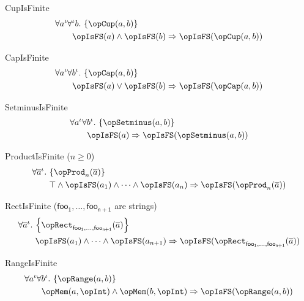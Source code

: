\documentclass[11pt, a4paper, oneside]{article}
\begin{document}
\begin{axioms}
\item[CupIsFinite] \[
        \begin{aligned}
            &\forall a^\idv \forall^\idv b.\, \st{ \opCup(a, b) } \\
            &\qquad \opIsFS(a) \wedge \opIsFS(b) \imp \opIsFS(\opCup(a, b))
        \end{aligned}
    \]

\item[CapIsFinite] \[
        \begin{aligned}
            &\forall a^\idv \forall b^\idv.\, \st{ \opCap(a, b) } \\
            &\qquad \opIsFS(a) \vee \opIsFS(b) \imp \opIsFS(\opCap(a, b))
        \end{aligned}
    \]

\item[SetminusIsFinite] \[
        \begin{aligned}
            &\forall a^\idv \forall b^\idv.\, \st{ \opSetminus(a, b) } \\
            &\qquad \opIsFS(a) \imp \opIsFS(\opSetminus(a, b))
        \end{aligned}
    \]

\item[ProductIsFinite ($n \ge 0$)] \[
        \begin{aligned}
            &\forall \overline{a}^\idv.\, \st{ \opProd_n(\overline{a}) } \\
            &\qquad \top \wedge \opIsFS(a_1) \wedge \dots \wedge \opIsFS(a_n) \imp \opIsFS(\opProd_n(\overline{a}))
        \end{aligned}
    \]

\item[RectIsFinite (\rm$\mathsf{foo_1},\dots,\mathsf{foo_{n+1}}$ are strings)] \[
        \begin{aligned}
            &\forall \overline{a}^\idv.\, \st{ \opRect_{\mathsf{foo_1}, \dots, \mathsf{foo_{n+1}}}(\overline{a}) } \\
            &\qquad \opIsFS(a_1) \wedge \dots \wedge \opIsFS(a_{n+1}) \imp \opIsFS(\opRect_{\mathsf{foo_1}, \dots, \mathsf{foo_{n+1}}}(\overline{a}))
        \end{aligned}
    \]

\item[RangeIsFinite] \[
        \begin{aligned}
            &\forall a^\idv \forall b^\idv.\, \st{ \opRange(a, b) } \\
            &\qquad \opMem(a, \opInt) \wedge \opMem(b, \opInt) \imp \opIsFS(\opRange(a, b))
        \end{aligned}
    \]


\end{axioms}
\end{document}
